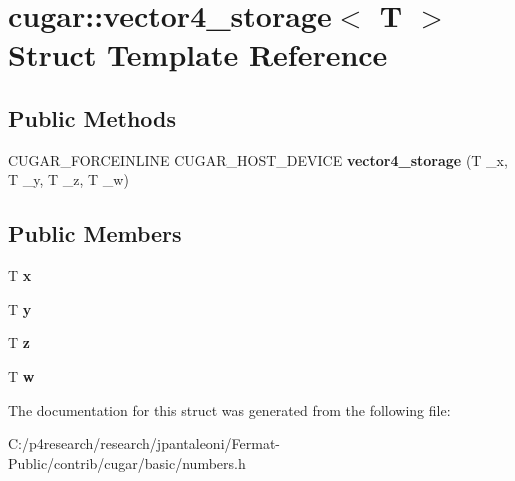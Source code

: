 \hypertarget{structcugar_1_1vector4__storage}{}\section{cugar\+:\+:vector4\+\_\+storage$<$ T $>$ Struct Template Reference}
\label{structcugar_1_1vector4__storage}
\subsection*{Public Methods}
\begin{DoxyCompactItemize}
\item 
\mbox{\label{structcugar_1_1vector4__storage_a00acfbb7ecd0b8133ae96fe21179f8b9}} 
C\+U\+G\+A\+R\+\_\+\+F\+O\+R\+C\+E\+I\+N\+L\+I\+NE C\+U\+G\+A\+R\+\_\+\+H\+O\+S\+T\+\_\+\+D\+E\+V\+I\+CE {\bfseries vector4\+\_\+storage} (T \+\_\+x, T \+\_\+y, T \+\_\+z, T \+\_\+w)
\end{DoxyCompactItemize}
\subsection*{Public Members}
\begin{DoxyCompactItemize}
\item 
\mbox{\label{structcugar_1_1vector4__storage_ac9ae0b6793d0a3b480f906d5336c8349}} 
T {\bfseries x}
\item 
\mbox{\label{structcugar_1_1vector4__storage_a1b64bc5f75109eb33644cbe7f8c111a3}} 
T {\bfseries y}
\item 
\mbox{\label{structcugar_1_1vector4__storage_a549964c978f9b40f494a725573198599}} 
T {\bfseries z}
\item 
\mbox{\label{structcugar_1_1vector4__storage_a0dcd2611ff3c2c17eecc3d708de33468}} 
T {\bfseries w}
\end{DoxyCompactItemize}


The documentation for this struct was generated from the following file\+:\begin{DoxyCompactItemize}
\item 
C\+:/p4research/research/jpantaleoni/\+Fermat-\/\+Public/contrib/cugar/basic/numbers.\+h\end{DoxyCompactItemize}
